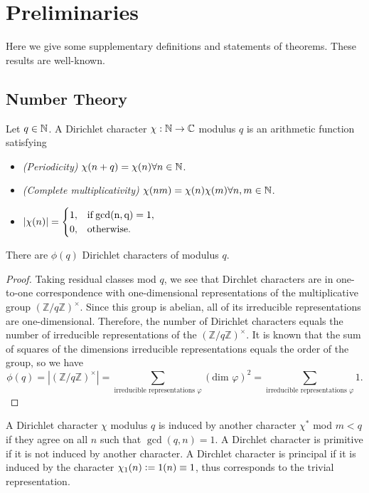 \section{Preliminaries}
Here we give some supplementary definitions and statements of theorems. These results are well-known. 
\subsection*{Number Theory}
\begin{definition}
	\label{dcharacter}
	Let $q\in\mathbb{N}$. A Dirichlet character $\chi:\mathbb{N}\to\mathbb{C}$ modulus $q$ is an arithmetic function satisfying \begin{itemize}
		\item \textit{(Periodicity)} $\chi(n+q)=\chi(n)\forall n\in\mathbb{N}$.
		\item \textit{(Complete multiplicativity)} $\chi(nm)=\chi(n)\chi(m)\forall n,m\in\mathbb{N}$.
		\item $|\chi(n)|=\begin{cases}
			1, & \rm{if }\gcd(n,q)=1,\\
			0, & \rm{otherwise.}
		\end{cases}$
	\end{itemize}
\end{definition}
\begin{proposition}
	There are $\phi(q)$ Dirichlet characters of modulus $q$.
\end{proposition}
\begin{proof}
	Taking residual classes mod $q$, we see that Dirchlet characters are in one-to-one correspondence with one-dimensional representations of the multiplicative group $(\mathbb{Z}/q\mathbb{Z})^{\times}$. Since this group is abelian, all of its irreducible representations are one-dimensional. Therefore, the number of Dirichlet characters equals the number of irreducible representations of the $(\mathbb{Z}/q\mathbb{Z})^{\times}$. It is known that the sum of squares of the dimensions irreducible representations equals the order of the group, so we have \[
		\phi(q)=|(\mathbb{Z}/q\mathbb{Z})^{\times}|=\sum_{\textrm{irreducible representations } \varphi}  (\textrm{dim } \varphi)^2 = \sum_{\textrm{irreducible representations } \varphi}  1.
	\]
\end{proof}
\begin{definition}
	A Dirichlet character $\chi$ modulus $q$ is induced by another character $\chi^*$ mod $m<q$ if they agree on all $n$ such that $\gcd(q,n)=1$. A Dirchlet character is primitive if it is not induced by another character. A Dirchlet character is principal if it is induced by the character $\chi_1(n)\mathrel{\mathop:}=1(n)\equiv 1$, thus corresponds to the trivial representation.
\end{definition}
